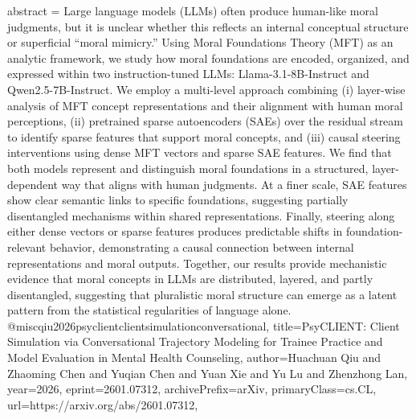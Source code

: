 {      abstract = {Large language models (LLMs) often produce human-like moral judgments, but it is unclear whether this reflects an internal conceptual structure or superficial ``moral mimicry.'' Using Moral Foundations Theory (MFT) as an analytic framework, we study how moral foundations are encoded, organized, and expressed within two instruction-tuned LLMs: Llama-3.1-8B-Instruct and Qwen2.5-7B-Instruct. We employ a multi-level approach combining (i) layer-wise analysis of MFT concept representations and their alignment with human moral perceptions, (ii) pretrained sparse autoencoders (SAEs) over the residual stream to identify sparse features that support moral concepts, and (iii) causal steering interventions using dense MFT vectors and sparse SAE features. We find that both models represent and distinguish moral foundations in a structured, layer-dependent way that aligns with human judgments. At a finer scale, SAE features show clear semantic links to specific foundations, suggesting partially disentangled mechanisms within shared representations. Finally, steering along either dense vectors or sparse features produces predictable shifts in foundation-relevant behavior, demonstrating a causal connection between internal representations and moral outputs. Together, our results provide mechanistic evidence that moral concepts in LLMs are distributed, layered, and partly disentangled, suggesting that pluralistic moral structure can emerge as a latent pattern from the statistical regularities of language alone.}
}@misc{qiu2026psyclientclientsimulationconversational,
      title={PsyCLIENT: Client Simulation via Conversational Trajectory Modeling for Trainee Practice and Model Evaluation in Mental Health Counseling}, 
      author={Huachuan Qiu and Zhaoming Chen and Yuqian Chen and Yuan Xie and Yu Lu and Zhenzhong Lan},
      year={2026},
      eprint={2601.07312},
      archivePrefix={arXiv},
      primaryClass={cs.CL},
      url={https://arxiv.org/abs/2601.07312},
}
